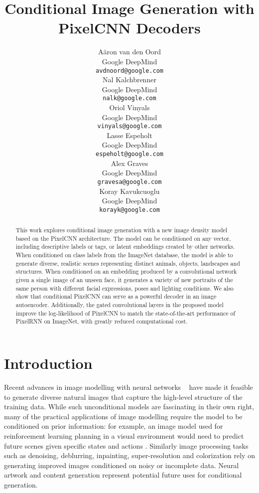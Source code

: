 \documentclass{article}
\title{Conditional Image Generation with\\ PixelCNN Decoders}
\author{
  Aäron van den Oord \\
  Google DeepMind \\
  \texttt{avdnoord@google.com} \\
  \And
  Nal Kalchbrenner \\
  Google DeepMind \\
  \texttt{nalk@google.com} \\
  \And
  Oriol Vinyals \\
  Google DeepMind \\
  \texttt{vinyals@google.com} \\
  \AND
  Lasse Espeholt \\
  Google DeepMind\\
  \texttt{espeholt@google.com} \\
  \And
  Alex Graves \\
  Google DeepMind\\
  \texttt{gravesa@google.com} \\
  \And
  Koray Kavukcuoglu \\
  Google DeepMind\\
  \texttt{korayk@google.com} \\
}
\begin{document}
\maketitle

\begin{abstract}

This work explores conditional image generation with a new image density model based on the PixelCNN architecture. The model can be conditioned on any vector, including descriptive labels or tags, or latent embeddings created by other networks. When conditioned on class labels from the ImageNet database, the model is able to generate diverse, realistic scenes representing distinct animals, objects, landscapes and structures. When conditioned on an embedding produced by a convolutional network given a single image of an unseen face, it generates a variety of new portraits of the same person with different facial expressions, poses and lighting conditions. We also show that conditional PixelCNN can serve as a powerful decoder in an image autoencoder. Additionally, the gated convolutional layers in the proposed model improve the log-likelihood of PixelCNN to match the state-of-the-art performance of PixelRNN on ImageNet, with greatly reduced computational cost.

\end{abstract}

\section{Introduction}

Recent advances in image modelling with neural networks ~\cite{van2016pixel, theis2015generative, rezende2014stochastic,gregor2013deep,gregor2015draw,uria2016neural,goodfellow2014generative} have made it feasible to generate diverse natural images that capture the high-level structure of the training data. While such unconditional models are fascinating in their own right, many of the practical applications of image modelling require the model to be conditioned on prior information: for example, an image model used for reinforcement learning planning in a visual environment would need to predict future scenes given specific states and actions \cite{oh2015action}. Similarly image processing tasks such as denoising, deblurring, inpainting, super-resolution and colorization rely on generating improved images conditioned on noisy or incomplete data. Neural artwork \cite{Inceptionism, gatys2015neural} and content generation represent potential future uses for conditional generation.
\end{document}
